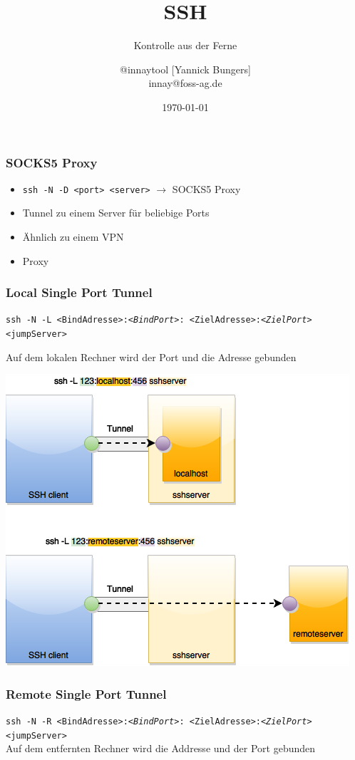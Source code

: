 \documentclass[handout]{beamer}
\title{SSH}
\subtitle{Kontrolle aus der Ferne}
\author{@innaytool [Yannick Bungers] \\ innay@foss-ag.de}
\institute{FOSS AG}
\date{\today}
\begin{document}
\begin{frame}
\titlepage
\end{frame}

%



%

%




%
\begin{frame}
	\frametitle{SOCKS5 Proxy}
	\begin{itemize}
		\item \texttt{ssh -N -D <port> <server>} $\rightarrow$ SOCKS5 Proxy
		\item Tunnel zu einem Server für beliebige Ports
		\item Ähnlich zu einem VPN
		\item Proxy
	\end{itemize}
\end{frame}
\begin{frame}
\frametitle{Local Single Port Tunnel}
\texttt{ssh -N -L <BindAdresse>:\textit{<BindPort>}: <ZielAdresse>:\textit{<ZielPort>} <jumpServer> }

Auf dem lokalen Rechner wird der Port und die Adresse gebunden
\end{frame}

\begin{frame}
	\includegraphics[scale=0.55]{ssh-L-tunnel.png}
\end{frame}

\begin{frame}
\frametitle{Remote Single Port Tunnel}
\texttt{ssh -N -R <BindAdresse>:\textit{<BindPort>}: <ZielAdresse>:\textit{<ZielPort>} <jumpServer>}\\
Auf dem entfernten Rechner wird die Addresse und der Port gebunden
\end{frame}
\end{document}
